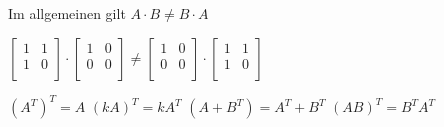 \documentclass{../tudscript}
\begin{document}
Im allgemeinen gilt \(A \cdot B \neq B \cdot A\)

\(\begin{bmatrix}  1 & 1 \\  1 & 0 \\ \end{bmatrix} \cdot \begin{bmatrix}  1 & 0 \\  0 & 0 \\ \end{bmatrix}\neq \begin{bmatrix}  1 & 0 \\  0 & 0 \\ \end{bmatrix} \cdot \begin{bmatrix}  1 & 1 \\  1 & 0 \\ \end{bmatrix}\)

\((A^T)^T = A\) \((kA)^T = kA^T\) \((A+B^T)= A^T+B^T\) \((AB)^T=B^TA^T\)
\end{document}
